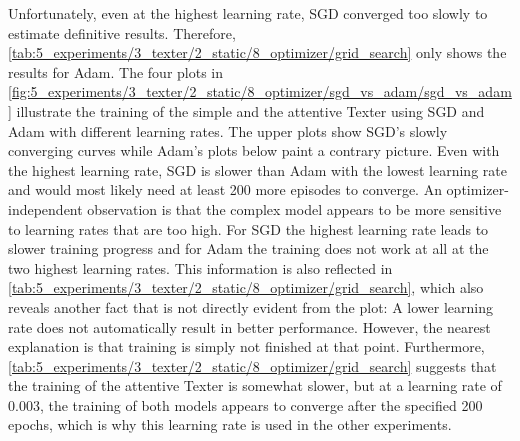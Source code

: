Unfortunately, even at the highest learning rate, SGD converged too slowly to estimate definitive results. Therefore, \autoref{tab:5_experiments/3_texter/2_static/8_optimizer/grid_search} only shows the results for Adam. The four plots in \autoref{fig:5_experiments/3_texter/2_static/8_optimizer/sgd_vs_adam/sgd_vs_adam} illustrate the training of the simple and the attentive Texter using SGD and Adam with different learning rates. The upper plots show SGD's slowly converging curves while Adam's plots below paint a contrary picture. Even with the highest learning rate, SGD is slower than Adam with the lowest learning rate and would most likely need at least 200 more episodes to converge. An optimizer-independent observation is that the complex model appears to be more sensitive to learning rates that are too high. For SGD the highest learning rate leads to slower training progress and for Adam the training does not work at all at the two highest learning rates. This information is also reflected in \autoref{tab:5_experiments/3_texter/2_static/8_optimizer/grid_search}, which also reveals another fact that is not directly evident from the plot: A lower learning rate does not automatically result in better performance. However, the nearest explanation is that training is simply not finished at that point. Furthermore, \autoref{tab:5_experiments/3_texter/2_static/8_optimizer/grid_search} suggests that the training of the attentive Texter is somewhat slower, but at a learning rate of 0.003, the training of both models appears to converge after the specified 200 epochs, which is why this learning rate is used in the other experiments.
